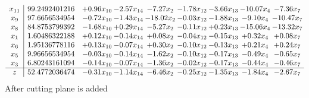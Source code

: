\documentclass[8pt]{article}
\begin{document}
\[\begin{array}{c| c c@{\hskip 2pt} c@{\hskip 2pt} c@{\hskip 2pt} c@{\hskip 2pt} c@{\hskip 2pt} c@{\hskip 2pt} c@{\hskip 2pt} }
 x_{11}   &  99.2492401216 & +  0.96 x_{10} & -2.57 x_{14} & -7.27 x_{2} & -1.78 x_{12} & -3.66 x_{13} & -10.07 x_{4} & -7.36 x_{7}\\
 x_{9}   &  97.6656534954 & -0.72 x_{10} & -1.43 x_{14} & -18.02 x_{2} & -0.03 x_{12} & -1.88 x_{13} & -9.10 x_{4} & -10.47 x_{7}\\
 x_{8}   &  84.8753799392 & -1.68 x_{10} & +  0.29 x_{14} & -5.27 x_{2} & -0.11 x_{12} & +  0.23 x_{13} & -15.06 x_{4} & -13.32 x_{7}\\
 x_{1}   &  1.60486322188 & +  0.12 x_{10} & -0.14 x_{14} & +  0.08 x_{2} & -0.04 x_{12} & -0.15 x_{13} & +  0.32 x_{4} & +  0.08 x_{7}\\
 x_{6}   &  1.95136778116 & +  0.13 x_{10} & -0.07 x_{14} & +  0.30 x_{2} & -0.10 x_{12} & -0.13 x_{13} & +  0.21 x_{4} & +  0.24 x_{7}\\
 x_{5}   &  9.96656534954 & -0.03 x_{10} & -0.14 x_{14} & -1.62 x_{2} & -0.10 x_{12} & -0.17 x_{13} & -0.49 x_{4} & -0.65 x_{7}\\
 x_{3}   &  6.80243161094 & -0.14 x_{10} & -0.07 x_{14} & -1.36 x_{2} & -0.02 x_{12} & -0.17 x_{13} & -0.44 x_{4} & -0.46 x_{7}\\
\hline
z    &  52.4772036474 & -0.31 x_{10} & -1.14 x_{14} & -6.46 x_{2} & -0.25 x_{12} & -1.35 x_{13} & -1.84 x_{4} & -2.67 x_{7}\\
\end{array}\]
 After cutting plane is added 
\end{document}
